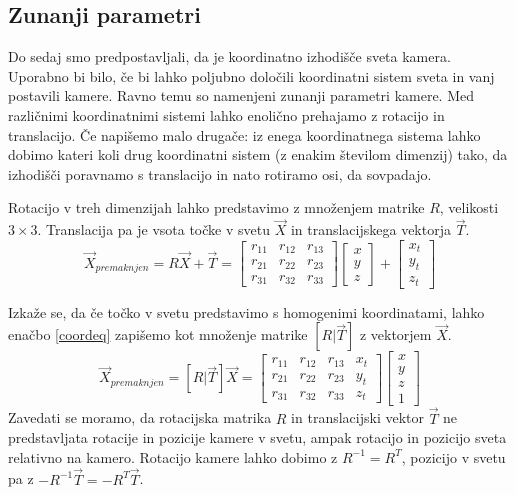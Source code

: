 \documentclass[a4paper, 12pt]{book}
\begin{document}
\subsection{Zunanji parametri}
Do sedaj smo predpostavljali, da je koordinatno izhodišče sveta kamera. Uporabno bi bilo, če bi lahko poljubno določili koordinatni sistem sveta in vanj postavili kamere. Ravno temu so namenjeni zunanji parametri kamere. Med različnimi koordinatnimi sistemi lahko enolično prehajamo z rotacijo in translacijo. Če napišemo malo drugače: iz enega koordinatnega sistema lahko dobimo kateri koli drug koordinatni sistem (z enakim številom dimenzij) tako, da izhodišči poravnamo s translacijo in nato rotiramo osi, da sovpadajo. 

Rotacijo v treh dimenzijah lahko predstavimo z množenjem matrike $R$, velikosti $3 \times 3$. Translacija pa je vsota točke v svetu $\vec{X}$ in translacijskega vektorja $\vec{T}$.
\begin{equation}
\vec{X}_{premaknjen} = R \vec{X} + \vec{T} = 
\begin{bmatrix}
r_{11} & r_{12} & r_{13} \\
r_{21} & r_{22} & r_{23} \\
r_{31} & r_{32} & r_{33}
\end{bmatrix}
\begin{bmatrix}
x \\
y \\
z 
\end{bmatrix}
+
\begin{bmatrix}
x_t \\
y_t \\
z_t 
\end{bmatrix}
\label{coordeq}
\end{equation}

Izkaže se, da če točko v svetu predstavimo s homogenimi koordinatami, lahko enačbo \eqref{coordeq} zapišemo kot množenje matrike $[R | \vec{T}]$ z vektorjem $\vec{X}$.
\begin{equation}
\vec{X}_{premaknjen} = [R|\vec{T}] \vec{X} = 
\begin{bmatrix}
r_{11} & r_{12} & r_{13} & x_t\\
r_{21} & r_{22} & r_{23} & y_t\\
r_{31} & r_{32} & r_{33} & z_t
\end{bmatrix}
\begin{bmatrix}
x \\
y \\
z \\
1
\end{bmatrix}
\label{coordeq}
\end{equation}
Zavedati se moramo, da rotacijska matrika $R$ in translacijski vektor $\vec{T}$ ne predstavljata rotacije in pozicije kamere v svetu, ampak rotacijo in pozicijo sveta relativno na kamero. Rotacijo kamere lahko dobimo z $R^{-1} = R^T$, pozicijo v svetu pa z $-R^{-1} \vec{T} = -R^T \vec{T}$.
\end{document}
